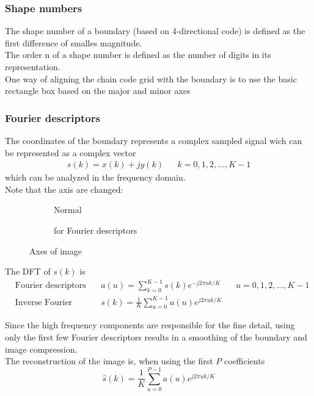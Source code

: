 \subsubsection{Shape numbers}
The shape number of a boundary (based on 4-directional code) is defined as the first difference of smalles magnitude.\\
The order n of a shape number is defined as the number of digits in its representation.\\
One way of aligning the chain code grid with the boundary is to use the basic rectangle box based on the major and minor axes\\

\subsubsection{Fourier descriptors}
The coordinates of the boundary represents a complex sampled signal wich can be represented as a complex vector
\begin{align*}
s(k)=x(k)+jy(k) && k=0,1,2,\ldots,K-1
\end{align*}
which can be analyzed in the frequency domain.\\

Note that the axis are changed:
\begin{figure}[h]
	\begin{subfigure}{0.5\textwidth}
		 \centering
		 
		 \caption{Normal}
	\end{subfigure}
	\begin{subfigure}{0.5\textwidth}
		\centering
		
		\caption{for Fourier descriptors}
	\end{subfigure}
	\caption{Axes of image}
\end{figure}

The DFT of $s(k)$ is \begin{align*}
& \text{Fourier descriptors of the boundary:} && a(u)=\sum\limits_{k=0}^{K-1}s(k)e^{-j2\pi uk/K} && u=0,1,2,\ldots,K-1\\
& \text{Inverse Fourier transform:} && s(k)=\frac{1}{K}\sum\limits_{u=0}^{K-1}a(u)e^{j2\pi uk/K}
\end{align*}

Since the high frequency components are responsible for the fine detail, using only the first few Fourier descriptors results in a smoothing of the boundary and image compression.\\
The reconstruction of the image is, when using the first $P$ coefficients
	\[
	\hat{s}(k) = \frac{1}{K} \sum\limits_{u=0}^{P-1} a(u) e^{j 2 \pi u k / K}
	\]

